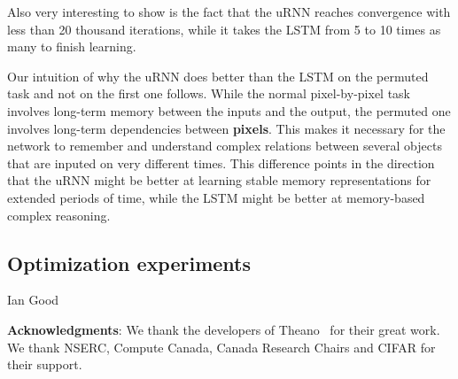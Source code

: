 \documentclass{article} %
\begin{document}
Also very interesting to show is the fact that the uRNN reaches convergence with less than 20 thousand iterations, while it takes the LSTM from 5 to 10 times as many to finish learning.

Our intuition of why the uRNN does better than the LSTM on the permuted task and not on the first one follows. While the normal pixel-by-pixel task involves long-term memory between the inputs and the output, the permuted one involves long-term dependencies between \textbf{pixels}. This makes it necessary for the network to remember and understand complex relations between several objects that are inputed on very different times. This difference points in the direction that the uRNN might be better at learning stable memory representations for extended periods of time, while the LSTM might be better at memory-based complex reasoning.

\subsection{Optimization experiments}
Ian Good

{\bf Acknowledgments}: We thank the developers of
Theano~\cite{Fred2010} for %
their great work. We thank NSERC, Compute Canada, Canada Research Chairs and CIFAR for their support.



\end{document}
